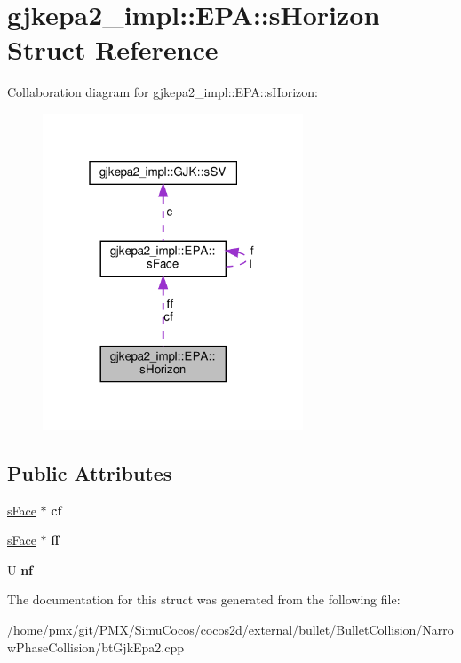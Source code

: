 \hypertarget{structgjkepa2__impl_1_1EPA_1_1sHorizon}{}\section{gjkepa2\+\_\+impl\+:\+:E\+PA\+:\+:s\+Horizon Struct Reference}
\label{structgjkepa2__impl_1_1EPA_1_1sHorizon}


Collaboration diagram for gjkepa2\+\_\+impl\+:\+:E\+PA\+:\+:s\+Horizon\+:
\nopagebreak
\begin{figure}[H]
\begin{center}
\leavevmode
\includegraphics[width=220pt]{structgjkepa2__impl_1_1EPA_1_1sHorizon__coll__graph}
\end{center}
\end{figure}
\subsection*{Public Attributes}
\begin{DoxyCompactItemize}
\item 
\mbox{\label{structgjkepa2__impl_1_1EPA_1_1sHorizon_a7c99c9a25b25fe45e7789bea49e3c863}} 
\hyperlink{structgjkepa2__impl_1_1EPA_1_1sFace}{s\+Face} $\ast$ {\bfseries cf}
\item 
\mbox{\label{structgjkepa2__impl_1_1EPA_1_1sHorizon_adbcd006a25dfd9a3057d51b0839f0488}} 
\hyperlink{structgjkepa2__impl_1_1EPA_1_1sFace}{s\+Face} $\ast$ {\bfseries ff}
\item 
\mbox{\label{structgjkepa2__impl_1_1EPA_1_1sHorizon_a2a65f3e810f41fa36e15c36eeb0f83c3}} 
U {\bfseries nf}
\end{DoxyCompactItemize}


The documentation for this struct was generated from the following file\+:\begin{DoxyCompactItemize}
\item 
/home/pmx/git/\+P\+M\+X/\+Simu\+Cocos/cocos2d/external/bullet/\+Bullet\+Collision/\+Narrow\+Phase\+Collision/bt\+Gjk\+Epa2.\+cpp\end{DoxyCompactItemize}
